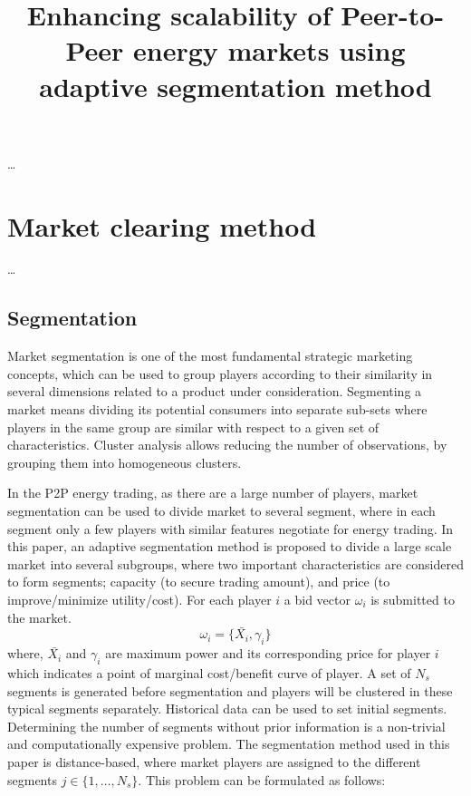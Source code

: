 \documentclass{scrartcl}
\title{Enhancing scalability of Peer-to-Peer energy markets using adaptive segmentation method}
\author{}
\date{}
\begin{document}
\maketitle

\begin{multicols*}{2}

\ldots

\section*{Market clearing method}

\ldots	

\subsection*{Segmentation}

Market segmentation is one of the most fundamental
strategic marketing concepts, which can be used to group
players according to their similarity in several dimensions
related to a product under consideration. Segmenting a
market means dividing its potential consumers into separate
sub-sets where players in the same group are similar with
respect to a given set of characteristics. Cluster analysis
allows reducing the number of observations, by grouping
them into homogeneous clusters.

In the P2P energy trading, as there are a large number of
players, market segmentation can be used to divide market
to several segment, where in each segment only a few
players with similar features negotiate for energy trading.
In this paper, an adaptive segmentation method is proposed
to divide a large scale market into several subgroups, where
two important characteristics are considered to form
segments; capacity (to secure trading amount), and price (to
improve/minimize utility/cost). 
For each player $i$ a bid
vector $\omega_i$ is submitted to the market.
\begin{equation}
	\omega_i = \{ \bar{X_i}, \gamma_i \}
\end{equation}
where, $\bar{X_i}$ and $\gamma_i$ are maximum power and its
corresponding price for player $i$ which indicates a point
of marginal cost/benefit curve of player. A set of $N_s$
segments is generated before segmentation and players will
be clustered in these typical segments separately. Historical
data can be used to set initial segments. Determining the
number of segments without prior information is a non-trivial and computationally expensive problem. The
segmentation method used in this paper is distance-based,
where market players are assigned to the different segments
$j \in \{1, \ldots, N_s\}$. This problem can be formulated as follows:


\end{multicols*}
\end{document}
